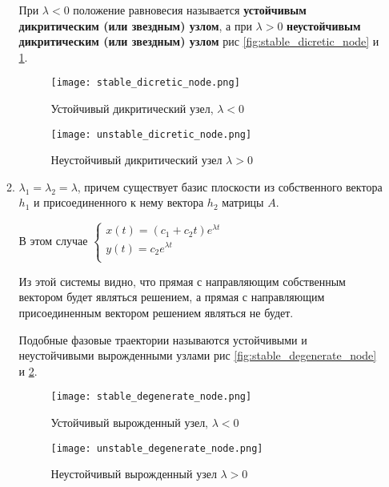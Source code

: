 \begin{enumerate}
\begin{enumerate}
    При $\lambda < 0$ положение равновесия называется \textbf{устойчивым дикритическим (или звездным) узлом}, а при $\lambda > 0$ \textbf{неустойчивым дикритическим (или звездным) узлом} рис \ref{fig:stable_dicretic_node} и \ref{fig:unstable_dicretic_node}.

    \begin{figure}[h!]
      \begin{center}
          \begin{minipage}[h!]{0.48\linewidth}
              \texttt{[image: stable\_dicretic\_node.png]}
              \caption{Устойчивый дикритический узел, $\lambda < 0$}
              \label{fig:stable_dicretic_node}
          \end{minipage}
          \hfill
          \begin{minipage}[h!]{0.48\linewidth}
              \texttt{[image: unstable\_dicretic\_node.png]}
              \caption{Неустойчивый дикритический узел $\lambda > 0$}
              \label{fig:unstable_dicretic_node}
          \end{minipage}
      \end{center}
    \end{figure}

    \item $\lambda_1 = \lambda_2 = \lambda$, причем существует базис плоскости из собственного вектора $h_1$ и присоединенного к нему вектора $h_2$ матрицы $A$.
    
    В этом случае
    $\begin{cases}
      x(t) = (c_1 + c_2 t) e^{\lambda t} \\
      y(t) = c_2 e^{\lambda t} \\
    \end{cases}$

    Из этой системы видно, что прямая с направляющим собственным вектором будет являться решением, а прямая с направляющим присоединенным вектором решением являться не будет.
    
    Подобные фазовые траектории называются устойчивыми и неустойчивыми вырожденными узлами рис \ref{fig:stable_degenerate_node} и \ref{fig:unstable_degenerate_node}.

    \begin{figure}[h!]
    	\begin{center}
    		\begin{minipage}[h!]{0.48\linewidth}
    			\texttt{[image: stable\_degenerate\_node.png]}
    			\caption{Устойчивый вырожденный узел, $\lambda < 0$}
    			\label{fig:stable_degenerate_node}
    		\end{minipage}
    		\hfill
    		\begin{minipage}[h!]{0.48\linewidth}
    			\texttt{[image: unstable\_degenerate\_node.png]}
    			\caption{Неустойчивый вырожденный узел $\lambda > 0$}
    			\label{fig:unstable_degenerate_node}
    		\end{minipage}
    	\end{center}
    \end{figure}
    

\end{enumerate}
\end{enumerate}
